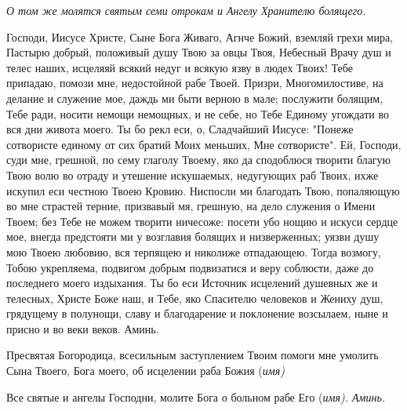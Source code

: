 \itshape О том же молятся святым семи отрокам и Ангелу Хранителю болящего.\normalfont{}





\mychapterending

 


Господи, Иисусе Христе, Сыне Бога Живаго, Агнче Божий, вземляй грехи мира, Пастырю добрый, положивый душу Твою за овцы Твоя, Небесный Врачу душ и телес наших, исцеляяй всякий недуг и всякую язву в людех Твоих! Тебе припадаю, помози мне, недостойной рабе Твоей. Призри, Многомилостиве, на делание и служение мое, даждь ми быти верною в мале; послужити болящим, Тебе ради, носити немощи немощных, и не себе, но Тебе Единому угождати во вся дни живота моего. Ты бо рекл еси, о, Сладчайший Иисусе: "Понеже сотвористе единому от сих братий Моих меньших, Мне сотвористе". Ей, Господи, суди мне, грешной, по сему глаголу Твоему, яко да сподоблюся творити благую Твою волю во отраду и утешение искушаемых, недугующих раб Твоих, ихже искупил еси честною Твоею Кровию. Ниспосли ми благодать Твою, попаляющую во мне страстей терние, призвавый мя, грешную, на дело служения о Имени Твоем; без Тебе не можем творити ничесоже: посети убо нощию и искуси сердце мое, внегда предстояти ми у возглавия болящих и низверженных; уязви душу мою Твоею любовию, вся терпящею и николиже отпадающею. Тогда возмогу, Тобою укрепляема, подвигом добрым подвизатися и веру соблюсти, даже до последнего моего издыхания. Ты бо еси Источник исцелений душевных же и телесных, Христе Боже наш, и Тебе, яко Спасителю человеков и Жениху душ, грядущему в полунощи, славу и благодарение и поклонение возсылаем, ныне и присно и во веки веков. Аминь. 





\mychapterending

 


Пресвятая Богородица, всесильным заступлением Твоим помоги мне умолить Сына Твоего, Бога моего, об исцелении раба Божия (\itshape имя\normalfont{})


\mychapterending

 


Все святые и ангелы Господни, молите Бога о больном рабе Его (\itshape имя\normalfont{}). Аминь.


\mychapterending